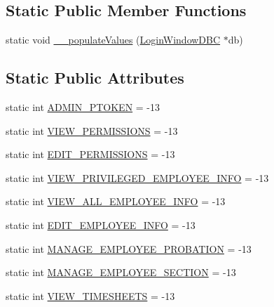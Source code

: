 \subsection*{Static Public Member Functions}
\begin{DoxyCompactItemize}
\item 
static void \hyperlink{class_permission_def_a79ee89d690eac6103cd9eb8058c1a06d}{\+\_\+\+\_\+populate\+Values} (\hyperlink{class_login_window_d_b_c}{Login\+Window\+D\+B\+C} $\ast$db)
\end{DoxyCompactItemize}
\subsection*{Static Public Attributes}
\begin{DoxyCompactItemize}
\item 
static int \hyperlink{class_permission_def_ae267892057954a6749a9b436e7751a8e}{A\+D\+M\+I\+N\+\_\+\+P\+T\+O\+K\+E\+N} = -\/13
\item 
static int \hyperlink{class_permission_def_a14db599601450b91c394ff9062b73a28}{V\+I\+E\+W\+\_\+\+P\+E\+R\+M\+I\+S\+S\+I\+O\+N\+S} = -\/13
\item 
static int \hyperlink{class_permission_def_a9ae45fec3427cee557b8943ea7f10b13}{E\+D\+I\+T\+\_\+\+P\+E\+R\+M\+I\+S\+S\+I\+O\+N\+S} = -\/13
\item 
static int \hyperlink{class_permission_def_ae7cb0f92929a96b5c66f47a08c506fce}{V\+I\+E\+W\+\_\+\+P\+R\+I\+V\+I\+L\+E\+G\+E\+D\+\_\+\+E\+M\+P\+L\+O\+Y\+E\+E\+\_\+\+I\+N\+F\+O} = -\/13
\item 
static int \hyperlink{class_permission_def_add7ee625795597b181f47847f2debd02}{V\+I\+E\+W\+\_\+\+A\+L\+L\+\_\+\+E\+M\+P\+L\+O\+Y\+E\+E\+\_\+\+I\+N\+F\+O} = -\/13
\item 
static int \hyperlink{class_permission_def_a9bd8ec4b319affac2d208dced7ab7cb3}{E\+D\+I\+T\+\_\+\+E\+M\+P\+L\+O\+Y\+E\+E\+\_\+\+I\+N\+F\+O} = -\/13
\item 
static int \hyperlink{class_permission_def_a0d21a16690d54b5a8d95fdc4309758e5}{M\+A\+N\+A\+G\+E\+\_\+\+E\+M\+P\+L\+O\+Y\+E\+E\+\_\+\+P\+R\+O\+B\+A\+T\+I\+O\+N} = -\/13
\item 
static int \hyperlink{class_permission_def_a1aa700a9f47dfecacc7364eb93d3a509}{M\+A\+N\+A\+G\+E\+\_\+\+E\+M\+P\+L\+O\+Y\+E\+E\+\_\+\+S\+E\+C\+T\+I\+O\+N} = -\/13
\item 
static int \hyperlink{class_permission_def_a124416119c668b3afe569be8a4055e54}{V\+I\+E\+W\+\_\+\+T\+I\+M\+E\+S\+H\+E\+E\+T\+S} = -\/13

\end{DoxyCompactItemize}
